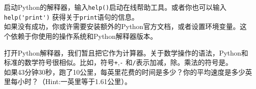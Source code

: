 \begin{ex}
启动Python的解释器，输入{\tt help()}启动在线帮助工具。或者你也可以输入\verb"help('print')" 获得关于{\tt print}语句的信息。\\

如果没有成功，你或许需要安装额外的Python官方文档，或者设置环境变量。这个依赖于你使用的操作系统和Python解释器版本。

\end{ex}


\begin{ex}
打开Python解释器，我们暂且把它作为计算器。关于数学操作的语法，Python和标准的数学符号很相似。比如，符号{\tt +},{\tt -} 和{\tt /}表示加减，除。乘法的符号是{\tt *}。\\

如果43分钟30秒，跑了10公里，每英里花费的时间是多少？你的平均速度是多少英里每小时？（Hint:一英里等于1.61公里）。

\end{ex}
























